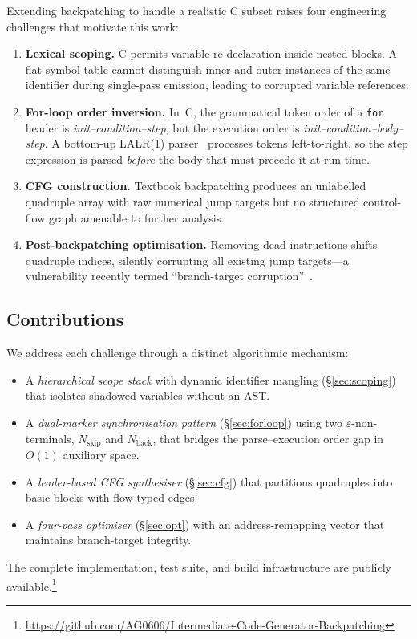 \documentclass[conference]{IEEEtran}
\begin{document}
Extending backpatching to handle a realistic C subset raises four engineering challenges that motivate this work:
\begin{enumerate}[leftmargin=*]
\item \textbf{Lexical scoping.} C permits variable re-declaration inside nested blocks. A flat symbol table cannot distinguish inner and outer instances of the same identifier during single-pass emission, leading to corrupted variable references.
\item \textbf{For-loop order inversion.} In~C, the grammatical token order of a \texttt{for} header is \emph{init--condition--step}, but the execution order is \emph{init--condition--body--step}. A bottom-up LALR(1) parser~\cite{deremer1982} processes tokens left-to-right, so the step expression is parsed \emph{before} the body that must precede it at run time.
\item \textbf{CFG construction.} Textbook backpatching produces an unlabelled quadruple array with raw numerical jump targets but no structured control-flow graph amenable to further analysis.
\item \textbf{Post-backpatching optimisation.} Removing dead instructions shifts quadruple indices, silently corrupting all existing jump targets---a vulnerability recently termed ``branch-target corruption''~\cite{xdead}.
\end{enumerate}

\subsection{Contributions}
We address each challenge through a distinct algorithmic mechanism:
\begin{itemize}[leftmargin=*]
\item A \emph{hierarchical scope stack} with dynamic identifier mangling (\S\ref{sec:scoping}) that isolates shadowed variables without an AST.
\item A \emph{dual-marker synchronisation pattern} (\S\ref{sec:forloop}) using two $\varepsilon$-non-terminals, $N_{\mathrm{skip}}$ and $N_{\mathrm{back}}$, that bridges the parse--execution order gap in $O(1)$ auxiliary space.
\item A \emph{leader-based CFG synthesiser} (\S\ref{sec:cfg}) that partitions quadruples into basic blocks with flow-typed edges.
\item A \emph{four-pass optimiser} (\S\ref{sec:opt}) with an address-remapping vector that maintains branch-target integrity.
\end{itemize}
The complete implementation, test suite, and build infrastructure are publicly available.\footnote{\url{https://github.com/AG0606/Intermediate-Code-Generator-Backpatching}}
\end{document}
